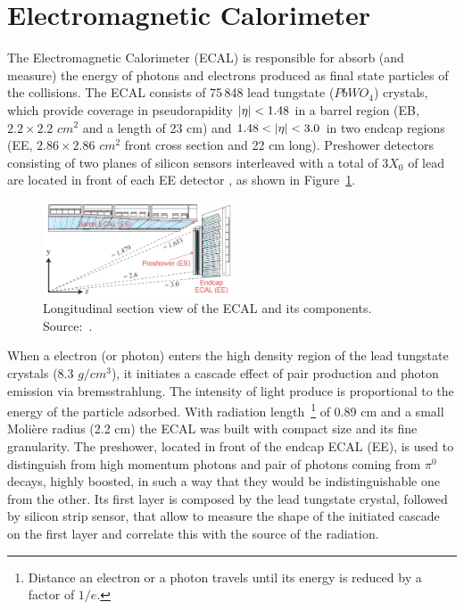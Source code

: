 
\section{Electromagnetic Calorimeter}

The Electromagnetic Calorimeter (ECAL) is responsible for absorb (and measure) the energy of photons and electrons produced as final state particles of the collisions. The ECAL consists of 75\,848 lead tungstate ($PbWO_4$) crystals, which provide coverage in pseudorapidity $\lvert \eta \rvert < 1.48 $ in a barrel region (EB, $2.2 \times 2.2 $ $cm^2$ and a length of 23 cm) and $1.48 < \lvert \eta \rvert < 3.0$ in two endcap regions (EE, $2.86 \times 2.86$ $cm^2$ front cross section and 22 cm long). Preshower detectors consisting of two planes of silicon sensors interleaved with a total of $3 X_0$ of lead are located in front of each EE detector \cite{Khachatryan:2015hwa}, as shown in Figure~\ref{cms_ecal}. 

\begin{figure}[htbp]
    \centering
    \includegraphics[width=0.5\textwidth]{figures_and_tables/experimental_setup/cms_ecal.png}
    \caption{Longitudinal section view of the ECAL and its components. Source:~\cite{Chatrchyan:2008zzk}.}
    \label{cms_ecal}
\end{figure}

When a electron (or photon) enters the high density region of the lead tungstate crystals (8.3 $g/cm^3$), it initiates a cascade effect of pair production and photon emission via bremsstrahlung. The intensity of light produce is proportional to the energy of the particle adsorbed. With radiation length~\footnote{Distance an electron or a photon travels
until its energy is reduced by a factor of $1/e$.} of 0.89 cm and a small Molière radius (2.2 cm) the ECAL was built with compact size and its fine granularity. The preshower, located in front of the endcap ECAL (EE), is used to distinguish from high momentum photons and pair of photons coming from $\pi^0$ decays, highly boosted, in such a way that they would be indistinguishable one from the other. Its first layer is composed by the lead tungstate crystal, followed by silicon strip sensor, that allow to measure the shape of the initiated cascade on the first layer and correlate this with the source of the radiation. 

